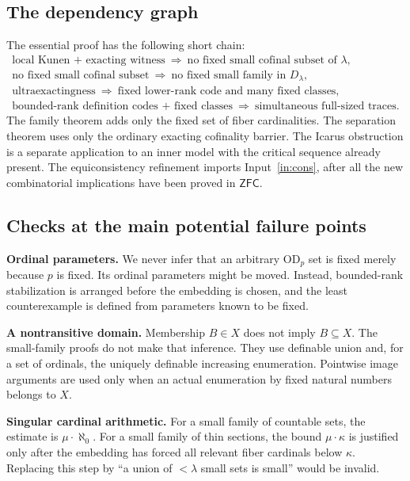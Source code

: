 \documentclass[11pt,letterpaper]{article}
\theoremstyle{definition}
\newcommand{\ZFC}{\mathsf{ZFC}}
\newcommand{\OD}{\mathrm{OD}}
\numberwithin{equation}{section}
\begin{document}
\subsection{The dependency graph}

The essential proof has the following short chain:
\[
\begin{gathered}
 \text{local Kunen + exacting witness}
 \ \Longrightarrow\ \text{no fixed small cofinal subset of }\lambda,\\
 \text{no fixed small cofinal subset}
 \ \Longrightarrow\ \text{no fixed small family in }D_\lambda,\\
 \text{ultraexactingness}
 \ \Longrightarrow\ \text{fixed lower-rank code and many fixed classes},\\
 \text{bounded-rank definition codes + fixed classes}
 \ \Longrightarrow\ \text{simultaneous full-sized traces}.
\end{gathered}
\]
The family theorem adds only the fixed set of fiber cardinalities. The
separation theorem uses only the ordinary exacting cofinality barrier.
The Icarus obstruction is a separate application to an inner model with the
critical sequence already present. The equiconsistency refinement imports
Input~\ref{in:cons}, after all the new combinatorial implications have been
proved in $\ZFC$.

\subsection{Checks at the main potential failure points}

\textbf{Ordinal parameters.}
We never infer that an arbitrary $\OD_p$ set is fixed merely because $p$ is
fixed. Its ordinal parameters might be moved. Instead, bounded-rank
stabilization is arranged before the embedding is chosen, and the least
counterexample is defined from parameters known to be fixed.

\textbf{A nontransitive domain.}
Membership $B\in X$ does not imply $B\subseteq X$. The small-family proofs
do not make that inference. They use definable union and, for a set of
ordinals, the uniquely definable increasing enumeration. Pointwise image
arguments are used only when an actual enumeration by fixed natural numbers
belongs to $X$.

\textbf{Singular cardinal arithmetic.}
For a small family of countable sets, the estimate is $\mu\cdot\aleph_0$.
For a small family of thin sections, the bound $\mu\cdot\kappa$ is justified
only after the embedding has forced all relevant fiber cardinals below
$\kappa$. Replacing this step by ``a union of $<\lambda$ small sets is small''
would be invalid.
\end{document}
